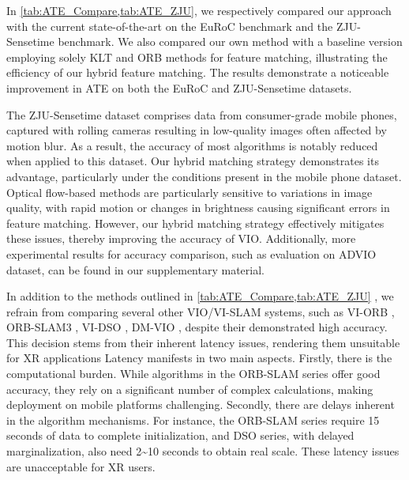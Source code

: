 In \cref{tab:ATE_Compare,tab:ATE_ZJU}, we respectively compared our approach with the current state-of-the-art \cite{leutenegger-ijrr-2015-OKVIS, qin-tro-2018_VINS-Mono, qin2019a_VINS_Fusion_Local, geneva2020openvins,hybvio} on the EuRoC benchmark and the ZJU-Sensetime benchmark.
We also compared our own method with a baseline version employing solely KLT and ORB methods for feature matching, illustrating  the efficiency of our hybrid feature matching. The results demonstrate a noticeable improvement in ATE on both the EuRoC and ZJU-Sensetime datasets.

The ZJU-Sensetime dataset comprises data from consumer-grade mobile phones, captured with rolling cameras resulting in low-quality images often affected by motion blur. As a result, the accuracy of most algorithms is notably reduced when applied to this dataset. Our hybrid matching strategy demonstrates its advantage, particularly under the conditions present in the mobile phone dataset. Optical flow-based methods are particularly sensitive to variations in image quality, with rapid motion or changes in brightness causing significant errors in feature matching. However, our hybrid matching strategy effectively mitigates these issues, thereby improving the accuracy of VIO.
Additionally, more experimental results for accuracy comparison, such as evaluation on ADVIO \cite{cortes2018advio} dataset, can be found in our supplementary material.

In addition to the methods outlined in \cref{tab:ATE_Compare,tab:ATE_ZJU} , we refrain from comparing several other VIO/VI-SLAM systems, such as VI-ORB \cite{murartal-ral-2017-VI-ORB}, ORB-SLAM3 \cite{campos2021orb-slam3}, VI-DSO \cite{von2018direct-VI-DSO}, DM-VIO \cite{stumberg22DM-VIO}, despite their demonstrated high accuracy. This decision stems from their inherent latency issues, rendering them unsuitable for XR applications Latency manifests in two main aspects. Firstly, there is the computational burden. While algorithms in the ORB-SLAM series offer good accuracy, they rely on a significant number of complex calculations, making deployment on mobile platforms challenging. Secondly, there are delays inherent in the algorithm mechanisms. For instance, the ORB-SLAM\cite{murartal-ral-2017-VI-ORB, campos2021orb-slam3} series require 15 seconds of data to complete initialization, and DSO \cite{von2018direct-VI-DSO, stumberg22DM-VIO} series, with delayed marginalization, also need 2\textasciitilde10 seconds to obtain real scale. These latency issues are unacceptable for XR users.
